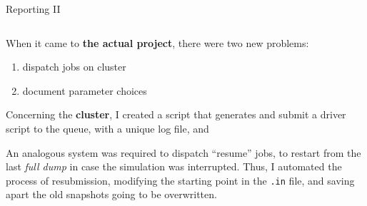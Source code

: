 \documentclass[9pt]{beamer}
\begin{document}
\begin{frame}{Reporting II}
\begin{columns}
\begin{column}{0.5\textwidth}
            When it came to \textbf{the actual project}, there were two new
            problems:
            \begin{enumerate}
                \item dispatch jobs on cluster
                \item document parameter choices
            \end{enumerate}

            Concerning the \textbf{cluster}, I created a script that generates
            and submit a driver script to the queue, with a unique log file, and 
            \vspace*{5pt}

            An analogous system was required to dispatch \enquote{resume} jobs,
            to restart from the last \textit{full dump} in case the simulation
            was interrupted.
            Thus, I automated the process of resubmission, modifying the
            starting point in the \texttt{.in} file, and saving apart the old
            snapshots going to be overwritten.

            \vspace*{10pt}
        \end{column}
    \end{columns}
\end{frame}
\end{document}
